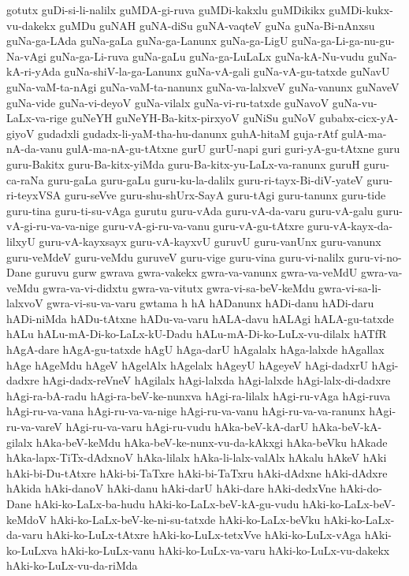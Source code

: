 {gotutx
guDi-si-li-nalilx
guMDA-gi-ruva
guMDi-kakxlu
guMDikikx
guMDi-kukx-vu-dakekx
guMDu
guNAH
guNA-diSu
guNA-vaqteV
guNa
guNa-Bi-nAnxsu
guNa-ga-LAda
guNa-gaLa
guNa-ga-Lanunx
guNa-ga-LigU
guNa-ga-Li-ga-nu-gu-Na-vAgi
guNa-ga-Li-ruva
guNa-gaLu
guNa-ga-LuLaLx
guNa-kA-Nu-vudu
guNa-kA-ri-yAda
guNa-shiV-la-ga-Lanunx
guNa-vA-gali
guNa-vA-gu-tatxde
guNavU
guNa-vaM-ta-nAgi
guNa-vaM-ta-nanunx
guNa-va-lalxveV
guNa-vanunx
guNaveV
guNa-vide
guNa-vi-deyoV
guNa-vilalx
guNa-vi-ru-tatxde
guNavoV
guNa-vu-LaLx-va-rige
guNeYH
guNeYH-Ba-kitx-pirxyoV
guNiSu
guNoV
gubabx-cicx-yA-giyoV
gudadxli
gudadx-li-yaM-tha-hu-danunx
guhA-hitaM
guja-rAtf
gulA-ma-nA-da-vanu
gulA-ma-nA-gu-tAtxne
gurU
gurU-napi
guri
guri-yA-gu-tAtxne
guru
guru-Bakitx
guru-Ba-kitx-yiMda
guru-Ba-kitx-yu-LaLx-va-ranunx
guruH
guru-ca-raNa
guru-gaLa
guru-gaLu
guru-ku-la-dalilx
guru-ri-tayx-Bi-diV-yateV
guru-ri-teyxVSA
guru-seVve
guru-shu-shUrx-SayA
guru-tAgi
guru-tanunx
guru-tide
guru-tina
guru-ti-su-vAga
gurutu
guru-vAda
guru-vA-da-varu
guru-vA-galu
guru-vA-gi-ru-va-va-nige
guru-vA-gi-ru-va-vanu
guru-vA-gu-tAtxre
guru-vA-kayx-da-lilxyU
guru-vA-kayxsayx
guru-vA-kayxvU
guruvU
guru-vanUnx
guru-vanunx
guru-veMdeV
guru-veMdu
guruveV
guru-vige
guru-vina
guru-vi-nalilx
guru-vi-no-Dane
guruvu
gurw
gwrava
gwra-vakekx
gwra-va-vanunx
gwra-va-veMdU
gwra-va-veMdu
gwra-va-vi-didxtu
gwra-va-vitutx
gwra-vi-sa-beV-keMdu
gwra-vi-sa-li-lalxvoV
gwra-vi-su-va-varu
gwtama
h
hA
hADanunx
hADi-danu
hADi-daru
hADi-niMda
hADu-tAtxne
hADu-va-varu
hALA-davu
hALAgi
hALA-gu-tatxde
hALu
hALu-mA-Di-ko-LaLx-kU-Dadu
hALu-mA-Di-ko-LuLx-vu-dilalx
hATfR
hAgA-dare
hAgA-gu-tatxde
hAgU
hAga-darU
hAgalalx
hAga-lalxde
hAgallax
hAge
hAgeMdu
hAgeV
hAgelAlx
hAgelalx
hAgeyU
hAgeyeV
hAgi-dadxrU
hAgi-dadxre
hAgi-dadx-reVneV
hAgilalx
hAgi-lalxda
hAgi-lalxde
hAgi-lalx-di-dadxre
hAgi-ra-bA-radu
hAgi-ra-beV-ke-nunxva
hAgi-ra-lilalx
hAgi-ru-vAga
hAgi-ruva
hAgi-ru-va-vana
hAgi-ru-va-va-nige
hAgi-ru-va-vanu
hAgi-ru-va-va-ranunx
hAgi-ru-va-vareV
hAgi-ru-va-varu
hAgi-ru-vudu
hAka-beV-kA-darU
hAka-beV-kA-gilalx
hAka-beV-keMdu
hAka-beV-ke-nunx-vu-da-kAkxgi
hAka-beVku
hAkade
hAka-lapx-TiTx-dAdxnoV
hAka-lilalx
hAka-li-lalx-valAlx
hAkalu
hAkeV
hAki
hAki-bi-Du-tAtxre
hAki-bi-TaTxre
hAki-bi-TaTxru
hAki-dAdxne
hAki-dAdxre
hAkida
hAki-danoV
hAki-danu
hAki-darU
hAki-dare
hAki-dedxVne
hAki-do-Dane
hAki-ko-LaLx-ba-hudu
hAki-ko-LaLx-beV-kA-gu-vudu
hAki-ko-LaLx-beV-keMdoV
hAki-ko-LaLx-beV-ke-ni-su-tatxde
hAki-ko-LaLx-beVku
hAki-ko-LaLx-da-varu
hAki-ko-LuLx-tAtxre
hAki-ko-LuLx-tetxVve
hAki-ko-LuLx-vAga
hAki-ko-LuLxva
hAki-ko-LuLx-vanu
hAki-ko-LuLx-va-varu
hAki-ko-LuLx-vu-dakekx
hAki-ko-LuLx-vu-da-riMda
}
